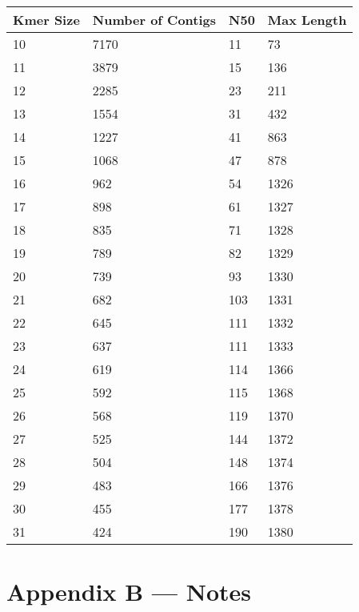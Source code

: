 \documentclass[12pt]{article}
\begin{document}
\begin{table}
\begin{tabular}{|l|l|l|l|} \hline
Kmer Size &Number of Contigs &N50 &Max Length\\\hline
10 & 7170 & 11 & 73 \\
11 & 3879 & 15 & 136 \\
12 & 2285 & 23 & 211 \\
13 & 1554 & 31 & 432 \\
14 & 1227 & 41 & 863 \\
15 & 1068 & 47 & 878 \\
16 & 962 & 54 & 1326 \\
17 & 898 & 61 & 1327 \\
18 & 835 & 71 & 1328 \\
19 & 789 & 82 & 1329 \\
20 & 739 & 93 & 1330 \\
21 & 682 & 103 & 1331 \\
22 & 645 & 111 & 1332 \\
23 & 637 & 111 & 1333 \\
24 & 619 & 114 & 1366 \\
25 & 592 & 115 & 1368 \\
26 & 568 & 119 & 1370 \\
27 & 525 & 144 & 1372 \\
28 & 504 & 148 & 1374 \\
29 & 483 & 166 & 1376 \\
30 & 455 & 177 & 1378 \\
31 & 424 & 190 & 1380 \\ \hline
\end{tabular}
\end{table}

\section*{Appendix B --- Notes}
\end{document}
